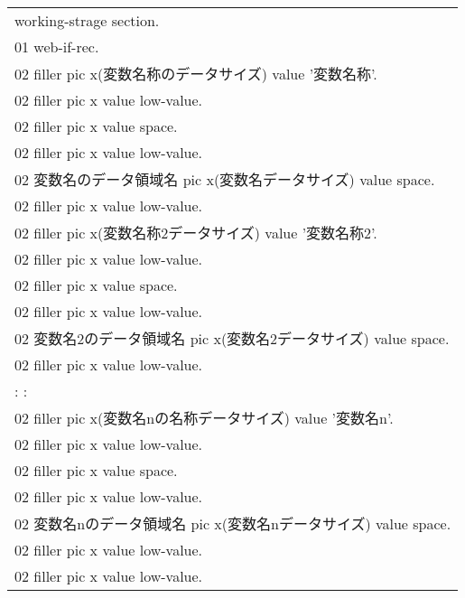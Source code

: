 {\footnotesize
\begin{tabular}{|l|}
\hline
 working-strage section.                                              \\
 01 web-if-rec.                                                       \\
   02  filler pic x(変数名称のデータサイズ) value '変数名称'.           \\
   02  filler pic x     value low-value.                              \\
   02  filler pic x     value space.                                  \\
   02  filler pic x     value low-value.                              \\
   02 変数名のデータ領域名 pic x(変数名データサイズ) value space.       \\
   02  filler pic x     value low-value.                              \\
   02  filler pic x(変数名称2データサイズ) value '変数名称2'.       \\
   02  filler pic x     value low-value.                              \\
   02  filler pic x     value space.                                  \\
   02  filler pic x     value low-value.                              \\
   02 変数名2のデータ領域名  pic x(変数名2データサイズ) value space.      \\
   02  filler pic x     value low-value.                              \\
            :       :                                                 \\
   02  filler pic x(変数名nの名称データサイズ) value '変数名n'.       \\
   02  filler pic x     value low-value.                              \\
   02  filler pic x     value space.                                  \\
   02  filler pic x     value low-value.                              \\
   02 変数名nのデータ領域名  pic x(変数名nデータサイズ) value space.      \\
   02  filler pic x     value low-value.                              \\
   02 filler pic x     value low-value.                               \\
\hline
\end{tabular}
}

